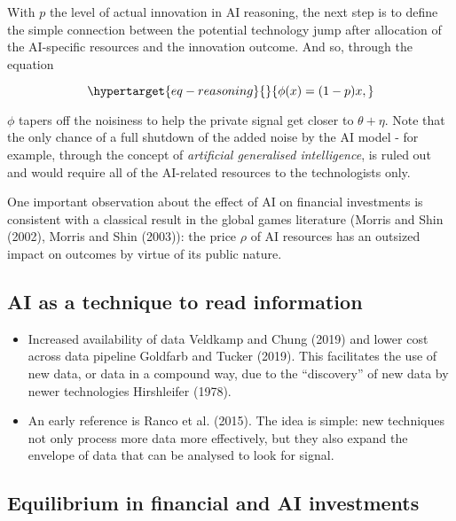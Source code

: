 \documentclass[
]{article}
\theoremstyle{plain}
\theoremstyle{remark}
\begin{document}
With \(p\) the level of actual innovation in AI reasoning, the next step
is to define the simple connection between the potential technology jump
after allocation of the AI-specific resources and the innovation
outcome. And so, through the equation

\begin{equation}\protect\hypertarget{eq-reasoning}{}{
\phi(x) = (1 - p)x,
}\label{eq-reasoning}\end{equation}

\(\phi\) tapers off the noisiness to help the private signal get closer
to \(\theta + \eta\). Note that the only chance of a full shutdown of
the added noise by the AI model - for example, through the concept of
\emph{artificial generalised intelligence}, is ruled out and would
require all of the AI-related resources to the technologists only.

One important observation about the effect of AI on financial
investments is consistent with a classical result in the global games
literature (Morris and Shin (2002), Morris and Shin (2003)): the price
\(\rho\) of AI resources has an outsized impact on outcomes by virtue of
its public nature.

\hypertarget{ai-as-a-technique-to-read-information}{%
\subsection{AI as a technique to read
information}\label{ai-as-a-technique-to-read-information}}

\begin{itemize}
\item
  Increased availability of data Veldkamp and Chung (2019) and lower
  cost across data pipeline Goldfarb and Tucker (2019). This facilitates
  the use of new data, or data in a compound way, due to the
  ``discovery'' of new data by newer technologies Hirshleifer (1978).
\item
  An early reference is Ranco et al. (2015). The idea is simple: new
  techniques not only process more data more effectively, but they also
  expand the envelope of data that can be analysed to look for signal.
\end{itemize}

\hypertarget{equilibrium-in-financial-and-ai-investments}{%
\subsection{Equilibrium in financial and AI
investments}\label{equilibrium-in-financial-and-ai-investments}}
\end{document}
